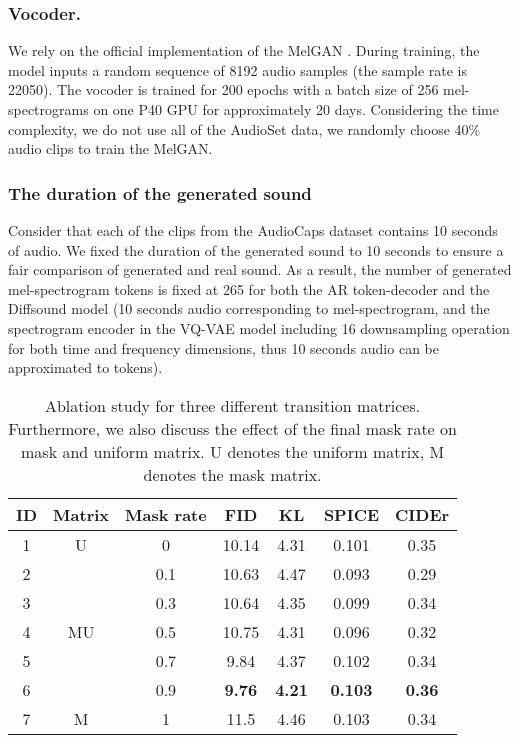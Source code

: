 \documentclass[lettersize,journal]{IEEEtran}
\begin{document}
\subsubsection{Vocoder.} We rely on the official implementation of the MelGAN \cite{kumar2019melgan}. During training, the model
inputs a random sequence of 8192 audio samples (the sample rate is 22050). The vocoder is trained for 200 epochs with a batch size of 256 mel-spectrograms on one P40 GPU for approximately 20 days. {\color{black}Considering the time complexity, we do not use all of the AudioSet data, we randomly choose 40\% audio clips to train the MelGAN.} \\
\subsubsection{The duration of the generated sound}
Consider that each of the clips from the AudioCaps dataset contains 10 seconds of audio. We fixed the duration of the generated sound to 10 seconds to ensure a fair comparison of generated and real sound. {\color{black}As a result, the number of generated mel-spectrogram tokens is fixed at 265 for both the AR token-decoder and the Diffsound model (10 seconds audio corresponding to  mel-spectrogram, and the spectrogram encoder in the VQ-VAE model including 16 downsampling operation for both time and frequency dimensions, thus 10 seconds audio can be approximated to  tokens).}






\begin{table}[t] \centering
\caption{Ablation study for three different transition matrices. Furthermore, we also discuss the effect of the final mask rate  on mask and uniform matrix. U denotes the uniform matrix, M denotes the mask matrix.}
\label{tab:my-table4}
\begin{tabular}{ccccccc}
\hline
ID & Matrix                   & Mask rate & FID   & KL   & SPICE & CIDEr \\ \hline
1  & U                        & 0         & 10.14 & 4.31 & 0.101 & 0.35  \\ \hline
2  & \multirow{5}{*}{MU} & 0.1       & 10.63 & 4.47 & 0.093 & 0.29  \\
3  &                          & 0.3       & 10.64 & 4.35 & 0.099 & 0.34  \\
4  &                          & 0.5       & 10.75 & 4.31 & 0.096 & 0.32  \\
5  &                          & 0.7       & 9.84  & 4.37 & 0.102 & 0.34  \\
6  &                          & 0.9       & \textbf{9.76}  & \textbf{4.21} & \textbf{0.103} & \textbf{0.36}  \\ \hline
7  & M                        & 1         & 11.5  & 4.46 & 0.103 & 0.34  \\ \hline
\end{tabular}
\end{table}
\end{document}

